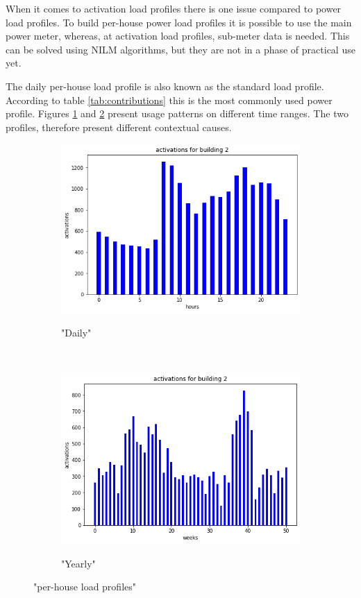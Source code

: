 When it comes to activation load profiles there is one issue compared to power load profiles.
To build per-house power load profiles it is possible to use the main power meter, whereas, at activation load profiles, sub-meter data is needed.
This can be solved using NILM algorithms, but they are not in a phase of practical use yet.

The daily per-house load profile is also known as the standard load profile. 
According to table \ref{tab:contributions} this is the most commonly used power profile.
Figures \ref{fig:SLPdaily2} and \ref{fig:SLPyearly2} present usage patterns on different time ranges. 
The two profiles, therefore present different contextual causes.


\begin{figure}[H]
	\begin{subfigure}{.5\textwidth}
		\caption{"Daily"}
		\includegraphics[width=1\linewidth]{../Figures/LPS/SLPdaily2.png}
		\label{fig:SLPdaily2}
	\end{subfigure}%
	~ 
	\begin{subfigure}{.5\textwidth}
		\caption{"Yearly"}
		\includegraphics[width=1\linewidth]{../Figures/LPS/SLPyearly2.png}
		\label{fig:SLPyearly2}
	\end{subfigure}%
	\label{fig:SLP}
	\caption{"per-house load profiles"}
\end{figure}

